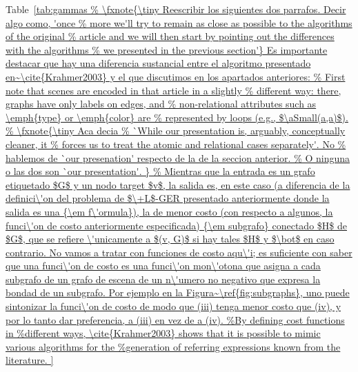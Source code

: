 Table~\ref{tab:gammas


Es importante destacar que hay una diferencia sustancial
entre el algoritmo presentado en~\cite{Krahmer2003} y el que discutimos
en los apartados anteriores:
%

Mientras que la entrada es un grafo etiquetado $G$ y un nodo target $v$, la
salida es, en este caso (a diferencia de la definici\'on del problema de $\+L$-GER 
presentado anteriormente donde la salida es una {\em f\'ormula}), la de menor costo (con
respecto a algunos, la funci\'on de costo anteriormente especificada) 
{\em subgrafo} conectado $H$ de $G$, que se refiere \'unicamente a $(v, G)$ si hay
tales $H$ y $\bot$ en caso contrario.

No vamos a tratar con funciones de costo aqu\'i; es suficiente con saber
que una funci\'on de costo es una funci\'on mon\'otona que asigna a cada
subgrafo de un grafo de escena de un n\'umero no negativo que expresa la
bondad de un subgrafo. Por ejemplo en la Figura~\ref{fig:subgraphs}, uno
puede sintonizar la funci\'on de costo de modo que (iii) tenga menor costo que (iv), y por lo tanto
dar preferencia, a (iii) en vez de a (iv).


}
